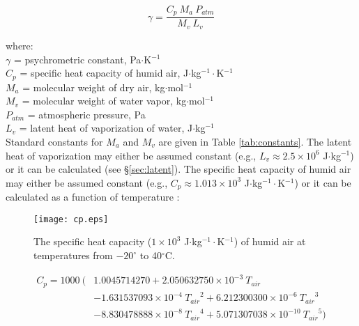 \begin{equation}
\label{eq:psychro}
	\gamma = \frac{C_p\: M_a\: P_{atm}}{M_v\: L_v}
\end{equation}

\noindent where: \\
\indent $\gamma$ = psychrometric constant, Pa$\cdot$K$^{-1}$ \\
\indent $C_p$ = specific heat capacity of humid air, J$\cdot$kg$^{-1}\cdot$K$^{-1}$\\
\indent $M_a$ = molecular weight of dry air, kg$\cdot$mol$^{-1}$\\
\indent $M_v$ = molecular weight of water vapor, kg$\cdot$mol$^{-1}$\\
\indent $P_{atm}$ = atmospheric pressure, Pa\\
\indent $L_v$ = latent heat of vaporization of water, J$\cdot$kg$^{-1}$\\

\noindent Standard constants for $M_a$ and $M_v$ are given in Table \ref{tab:constants}. 
The latent heat of vaporization may either be assumed constant (e.g., $L_v \approx 2.5\times 10^6$ J$\cdot$kg$^{-1}$) or it can be calculated (see \S \ref{sec:latent}). 
The specific heat capacity of humid air may either be assumed constant (e.g., $C_p \approx 1.013\times 10^3$ J$\cdot$kg$^{-1}\cdot$K$^{-1}$) or it can be calculated as a function of temperature \parencite[Eq. 47]{tsilingiris08}:

\begin{figure}[ht!]
    \texttt{[image: cp.eps]}
    \caption{The specific heat capacity ($1\times 10^3$ J$\cdot$kg$^{-1}\cdot$K$^{-1}$) of humid air at temperatures from $-20^{\circ}$ to 40$^{\circ}$C.}
    \label{fig:cp}
\end{figure}

\begin{equation}
\label{eq:cp}
	\begin{split}
		C_p = 1000\: ( & 1.0045714270 
		                 + 2.050632750\times 10^{-3}\: T_{air} \\
		               & - 1.631537093\times 10^{-4}\: {T_{air}}^{2} 
		                 + 6.212300300\times 10^{-6}\: {T_{air}}^{3} \\
		               & - 8.830478888\times 10^{-8}\: {T_{air}}^{4} 
		                 + 5.071307038\times 10^{-10}\: {T_{air}}^{5} )
	\end{split}
\end{equation}

